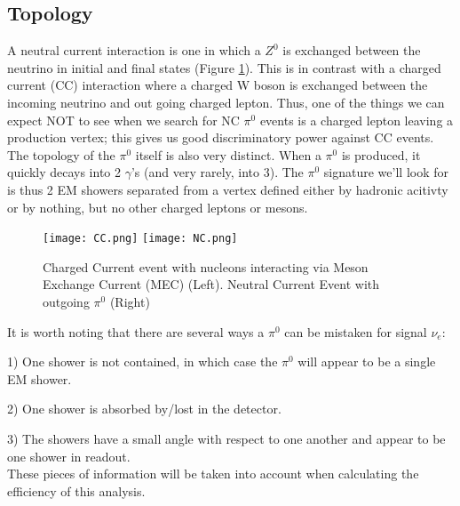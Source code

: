 \documentclass[12pt]{article}
\begin{document}
\subsection{Topology}
\par A neutral current interaction is one in which a $Z^0$ is exchanged between the neutrino in initial and final states (Figure \ref{fig:CCNC}). This is in contrast with a charged current (CC) interaction where a charged W boson is exchanged between the incoming neutrino and out going charged lepton. Thus, one of the things we can expect NOT to see when we search for NC $\pi^0$ events is a charged lepton leaving a production vertex; this gives us good discriminatory power against CC events.  The topology of the $\pi^0$ itself is also very distinct.  When a $\pi^0$ is produced, it quickly decays into 2 $\gamma$'s (and very rarely, into 3). The $\pi^0$ signature we'll look for is thus 2 EM showers separated from a vertex defined either by hadronic acitivty or by nothing, but no other charged leptons or mesons. 

\begin{figure}[h!]
\centering
\texttt{[image: CC.png]}
\hspace{.5 cm}
\texttt{[image: NC.png]}
\caption{Charged Current event with nucleons interacting via Meson Exchange Current (MEC) (Left). Neutral Current Event with outgoing $\pi^0$ (Right)}
\label{fig:CCNC}
\end{figure}

It is worth noting that there are several ways a $\pi^0$ can be mistaken for signal $\nu_e$:
\par 1) One shower is not contained, in which case the $\pi^0$ will appear to be a single EM shower.
\par 2) One shower is absorbed by/lost in the detector.
\par 3) The showers have a small angle with respect to one another and appear to be one shower in readout.
\\These pieces of information will be taken into account when calculating the efficiency of this analysis.  
\end{document}
